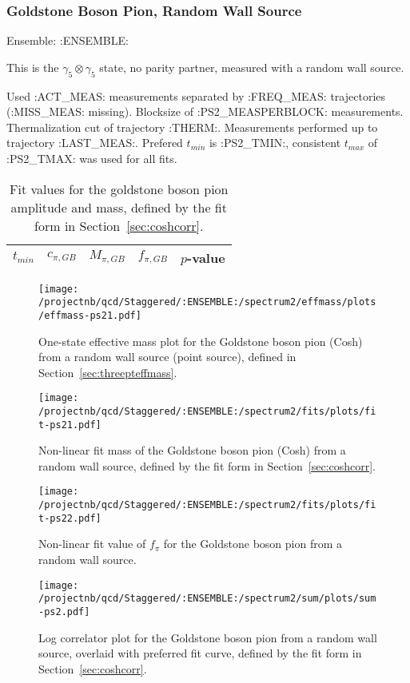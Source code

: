 \clearpage

\subsubsection{Goldstone Boson Pion, Random Wall Source}

Ensemble: :ENSEMBLE:

This is the $\gamma_5 \otimes \gamma_5$ state, no parity partner, measured with a random wall source.

{\small{Used :ACT_MEAS: measurements separated by :FREQ_MEAS: trajectories (:MISS_MEAS: missing). Blocksize of :PS2_MEASPERBLOCK: measurements. Thermalization cut of trajectory :THERM:. Measurements performed up to trajectory :LAST_MEAS:. Prefered $t_{min}$ is :PS2_TMIN:, consistent $t_{max}$ of :PS2_TMAX: was used for all fits.}}

\begin{table}[ht!]
\centering
\scriptsize
\begin{tabular}{|c|c|c|c|c|}
\hline
 $t_{min}$ & $c_{\pi, GB}$ &  $M_{\pi, GB}$ & $f_{\pi,GB}$ & $p$-value \\
\hline

\end{tabular}
\caption{Fit values for the goldstone boson pion amplitude and mass, defined by the fit form in Section~\ref{sec:coshcorr}.}
\end{table}

\begin{multicols}{2}
\begin{figure}[H]
\centering
\texttt{[image: /projectnb/qcd/Staggered/:ENSEMBLE:/spectrum2/effmass/plots/effmass-ps21.pdf]}
\caption{One-state effective mass plot for the Goldstone boson pion (Cosh) from a random wall source (point source), defined in Section~\ref{sec:threepteffmass}.}
\end{figure}
\columnbreak
\begin{figure}[H]
\centering
\texttt{[image: /projectnb/qcd/Staggered/:ENSEMBLE:/spectrum2/fits/plots/fit-ps21.pdf]}
\caption{Non-linear fit mass of the Goldstone boson pion (Cosh) from a random wall source, defined by the fit form in Section~\ref{sec:coshcorr}.}
\end{figure}
\end{multicols}

\begin{multicols}{2}
\begin{figure}[H]
\centering
\texttt{[image: /projectnb/qcd/Staggered/:ENSEMBLE:/spectrum2/fits/plots/fit-ps22.pdf]}
\caption{Non-linear fit value of $f_\pi$ for the Goldstone boson pion from a random wall source.}
\end{figure}
\columnbreak
\begin{figure}[H]
\centering
\texttt{[image: /projectnb/qcd/Staggered/:ENSEMBLE:/spectrum2/sum/plots/sum-ps2.pdf]}
\caption{Log correlator plot for the Goldstone boson pion from a random wall source, overlaid with preferred fit curve, defined by the fit form in Section~\ref{sec:coshcorr}.}
\end{figure}
\end{multicols}


